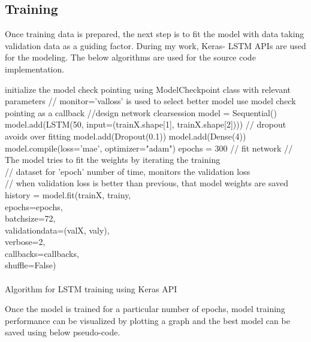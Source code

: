 \subsection{Training }
Once training data is prepared, the next step is to fit the model with data taking validation data as a guiding factor. During my work, Keras- LSTM APIs are used for the modeling. The below algorithms are used for the source code implementation.\\
\begin{algorithm}[H]
\SetAlgoLined
{}
 initialize the model check pointing using ModelCheckpoint class with relevant parameters\;
 // monitor='val\textunderscore loss' is used to select better model\;
	use model check pointing as a callback\;
 //design network\;
 clear\textunderscore session\;
 model = Sequential()\;
 model.add(LSTM(50, input\textunderscore =(train\textunderscore X.shape[1], train\textunderscore X.shape[2]))) \;
 // dropout avoids over fitting \;
 model.add(Dropout(0.1))\; 
 model.add(Dense(4))\;
 model.compile(loss='mae', optimizer="adam")\;
 epochs = 300\;
 // fit network\;
 // The model tries to fit the weights by iterating the training \\
 // dataset for 'epoch' number of time, monitors the validation loss  \\
 // when validation loss is better than previous, that model weights are saved
 history = model.fit(train\textunderscore X, train\textunderscore y, \\
 \HS \HS \HS \HS epochs=epochs, \\
 \HS \HS \HS \HS batch\textunderscore size=72,\\
 \HS \HS \HS \HS validation\textunderscore data=(val\textunderscore X, val\textunderscore y),\\
 \HS \HS \HS \HS verbose=2,\\
 \HS \HS \HS \HS callbacks=callbacks,\\
 \HS \HS \HS \HS shuffle=False)
~\\
~\\
\caption{Algorithm for LSTM training using Keras API} 
\end{algorithm} \label{training-algo}

Once the model is trained for a particular number of epochs, model training performance can be visualized by plotting a graph and the best model can be saved using below pseudo-code. \\

